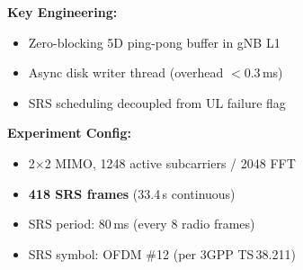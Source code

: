 \documentclass[aspectratio=169, 11pt]{beamer}
\begin{document}
\begin{frame}
\vspace{2mm}
\begin{minipage}[t]{0.48\textwidth}
\small\textbf{Key Engineering:}
\begin{itemize}\setlength\itemsep{1pt}\footnotesize
    \item Zero-blocking 5D ping-pong buffer in gNB L1
    \item Async disk writer thread (overhead $<0.3$\,ms)
    \item SRS scheduling decoupled from UL failure flag
\end{itemize}
\end{minipage}\hfill
\begin{minipage}[t]{0.48\textwidth}
\small\textbf{Experiment Config:}
\begin{itemize}\setlength\itemsep{1pt}\footnotesize
    \item 2$\times$2 MIMO, 1248 active subcarriers / 2048 FFT
    \item \textbf{418 SRS frames} (33.4\,s continuous)
    \item SRS period: 80\,ms (every 8 radio frames)
    \item SRS symbol: OFDM \#12 (per 3GPP TS\,38.211)
\end{itemize}
\end{minipage}

\end{frame}
\end{document}
